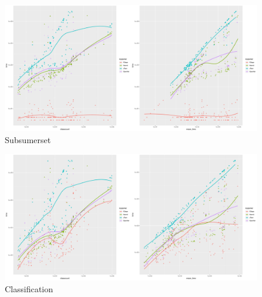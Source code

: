 \documentclass[a4paper]{article}
\begin{document}
\begin{figure}[ht]
	\centering
	\includegraphics[width=15cm]{fig/subsumerset.pdf}
	\caption{Subsumerset}
	\label{fig2}
\end{figure}

\begin{figure}[ht]
	\centering
	\includegraphics[width=15cm]{fig/classification.pdf}
	\caption{Classification}
	\label{fig2}
\end{figure}




\end{document}
